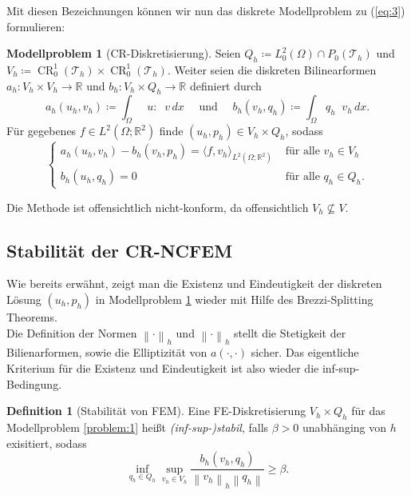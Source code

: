 \documentclass[a4paper]{scrartcl}
\newcommand{\real}{\mathbb{R}}
\newcommand{\Ltwo}{L^2}
\newcommand{\crfem}{\operatorname{CR}_0^1}
\newcommand{\mesh}{\mathcal{T}_h}
\newcommand{\dx}{\,dx}
\newcommand{\norm}[1]{\left\lVert#1\right\rVert}
\newcommand{\hnorm}[1]{\left\lVert#1\right\rVert_h}
\DeclareMathOperator{\divh}{div_h}
\DeclareMathOperator{\nablah}{\nabla_{\textit{h}}}
\theoremstyle{plain}
\theoremstyle{definition}
\newtheorem{definition}{Definition}
\newtheorem{modellproblem}{Modellproblem}
\theoremstyle{remark}
\begin{document}
\noindent Mit diesen Bezeichnungen können wir nun das diskrete
Modellproblem zu (\ref{eq:3}) formulieren: 

\begin{modellproblem}[CR-Diskretisierung] \label{problem:3}
  Seien \(Q_h \coloneqq \Ltwo_0(\Omega) \cap
  P_0(\mesh)\) und \(V_h \coloneqq \crfem(\mesh) \times \crfem(\mesh)\).
  Weiter seien die diskreten Bilinearformen \(a_h\colon V_h \times V_h
  \rightarrow \real\) und \(b_h\colon V_h \times Q_h \rightarrow
  \real\) definiert durch
  \begin{equation}
    \label{eq:11}
    a_h(u_h, v_h) \coloneqq \int_\Omega \nablah u : \nablah v \dx
    \quad \text{ und } \quad b_h(v_h, q_h) \coloneqq \int_\Omega q_h\divh v_h \dx. 
  \end{equation}
  Für gegebenes \(f \in \Ltwo(\Omega; \real^2)\) finde \((u_h, p_h)
  \in V_h \times Q_h\), sodass 
  \begin{equation}
    \label{eq:12}
    \begin{cases}
      a_h(u_h, v_h) - b_h(v_h, p_h) = \langle f, v_h \rangle_{\Ltwo(\Omega; \real^2)} & \text{ für alle } v_h \in V_h \\
      b_h(u_h, q_h) = 0 & \text{ für alle } q_h \in Q_h. 
    \end{cases}
  \end{equation}
\end{modellproblem}

\noindent Die Methode ist offensichtlich nicht-konform, da offensichtlich \(V_h \not\subseteq V\).



\subsection{Stabilität der CR-NCFEM}
\label{sec:stabilitat-der-cr}

Wie bereits erwähnt, zeigt man die Existenz und Eindeutigkeit der
diskreten Lösung \((u_h, p_h)\) in Modellproblem \ref{problem:3}
wieder mit Hilfe des Brezzi-Splitting Theorems.\\ 

\noindent Die Definition der Normen \(\norm{\cdot}_h\) und
\(\hnorm{\cdot}\) stellt die Stetigkeit der Bilienarformen, sowie die
Elliptizität von \(a(\cdot, \cdot)\) sicher. Das eigentliche Kriterium
für die Existenz und Eindeutigkeit ist also wieder die
inf-sup-Bedingung. 

\begin{definition}[Stabilität von FEM] \label{def:1}
  Eine FE-Diskretisierung \(V_h\times Q_h\) für das Modellproblem
  \ref{problem:1} heißt \emph{(inf-sup-)stabil}, falls \(\beta > 0\)
  unabhänging von \(h\) exisitiert, sodass  
  \begin{equation}
    \label{eq:14}
    \inf_{q_h \in Q_h} \sup_{v_h \in V_h} \frac{b_h(v_h, q_h)}{\hnorm{v_h} \norm{q_h}} \geq \beta. 
  \end{equation}
  \end{definition}
\end{document}
